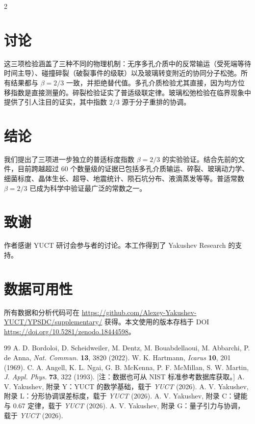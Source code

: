 \documentclass[11pt,a4paper]{article}
\newcommand{\betaf}{\beta}
\begin{document}
\begin{multicols}{2}
		\section{讨论}
		
		这三项检验涵盖了三种不同的物理机制：无序多孔介质中的反常输运（受死端等待时间主导）、碰撞碎裂（破裂事件的级联）以及玻璃转变附近的协同分子松弛。所有结果都与 \(\betaf = 2/3\) 一致，并拒绝替代值。多孔介质检验尤其直接，因为均方位移指数是直接测量的。碎裂检验证实了普适级联定律。玻璃松弛检验在临界现象中提供了引人注目的证实，其中指数 \(2/3\) 源于分子重排的协调。
		
		\section{结论}
		
		我们提出了三项进一步独立的普适标度指数 \(\betaf = 2/3\) 的实验验证。结合先前的文件，目前跨越超过 60 个数量级的证据已包括多孔介质输运、碎裂、玻璃动力学、细菌标度、晶体生长、超导、地震统计、陨石坑分布、液滴蒸发等等。普适常数 \(\betaf = 2/3\) 已成为科学中验证最广泛的常数之一。
		
		\section*{致谢}
		
		作者感谢 YUCT 研讨会参与者的讨论。本工作得到了 Yakushev Research 的支持。
		
		\section*{数据可用性}
		所有数据和分析代码可在 \url{https://github.com/Alexey-Yakushev-YUCT/YPSDC/supplementary/} 获得。本文使用的版本存档于 DOI \url{https://doi.org/10.5281/zenodo.18444598}。
		
		\begin{thebibliography}{99}
			 A. D. Bordoloi, D. Scheidweiler, M. Dentz, M. Bouabdellaoui, M. Abbarchi, P. de Anna, \emph{Nat. Commun.} \textbf{13}, 3820 (2022).
			 W. K. Hartmann, \emph{Icarus} \textbf{10}, 201 (1969).
			 C. A. Angell, K. L. Ngai, G. B. McKenna, P. F. McMillan, S. W. Martin, \emph{J. Appl. Phys.} \textbf{73}, 322 (1993). [注：数据也可从 NIST 标准参考数据库获取。]
			 A. V. Yakushev, 附录 Y：YUCT 的数学基础，载于 \emph{YUCT} (2026).
			 A. V. Yakushev, 附录 L：分形协调误差标度，载于 \emph{YUCT} (2026).
			 A. V. Yakushev, 附录 C：键能与 0.67 定律，载于 \emph{YUCT} (2026).
			 A. V. Yakushev, 附录 G：量子引力与协调，载于 \emph{YUCT} (2026).
		\end{thebibliography}
		
	\end{multicols}
\end{document}
